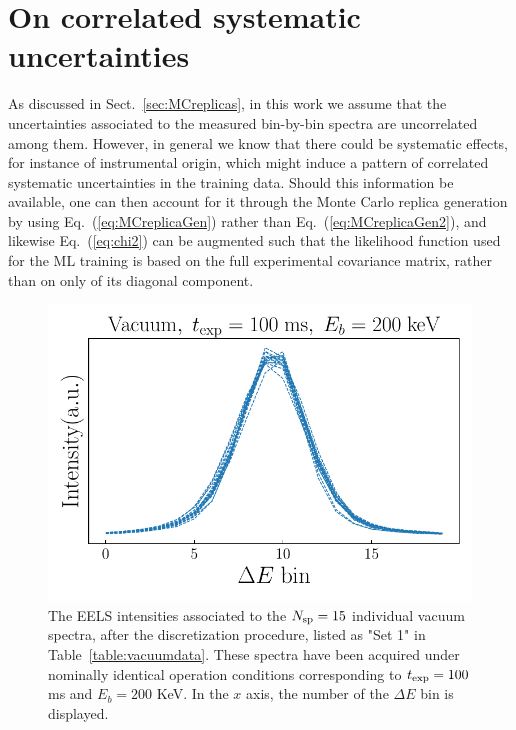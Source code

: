 {\color{red}

  \section{On correlated systematic uncertainties}
  \label{app:corr}

As discussed in Sect.~\ref{sec:MCreplicas}, in this work
we assume that the uncertainties associated to the measured
bin-by-bin spectra are uncorrelated among them.
%
However, in general we know that there could be systematic effects,
for instance of instrumental origin, which might induce
a pattern of correlated systematic uncertainties in the training
data.
%
Should this information be available, one can then
account for it through the Monte Carlo replica
generation by using Eq.~(\ref{eq:MCreplicaGen}) rather than
Eq.~(\ref{eq:MCreplicaGen2}), and likewise
Eq.~(\ref{eq:chi2}) can be augmented such that the likelihood
function used for the ML training
is based on the full experimental covariance matrix,
rather than on only of its diagonal component.

\begin{figure}[t]
\begin{centering}
  \includegraphics[width=0.80\linewidth]{plots/spectra-app.pdf}
  \caption{\small \color{red} The EELS intensities associated
    to the $N_{\rm sp}=15$ individual vacuum spectra, after the discretization
    procedure, listed as "Set 1"
    in Table~\ref{table:vacuumdata}.
    These spectra have been acquired under nominally
    identical operation conditions 
    corresponding to $t_{\rm exp}=100$ ms and $E_b=200$ KeV.
    In the $x$ axis, the number of the $\Delta E$ bin is displayed.
  }
\label{fig:spectra-app}
\end{centering}
\end{figure}


}
